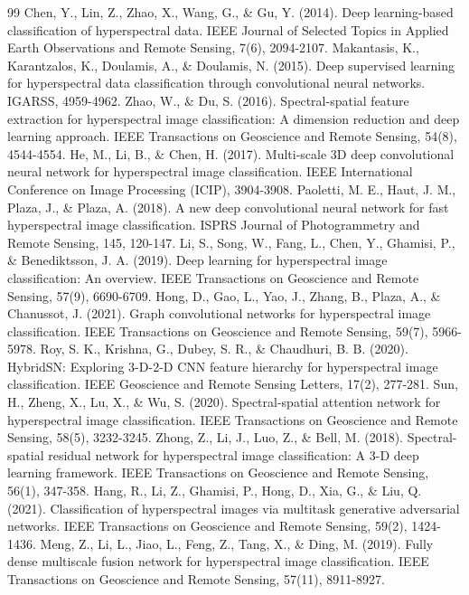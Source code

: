 \documentclass[pdflatex,sn-mathphys-num,iicol]{sn-jnl}
\begin{document}
\begin{thebibliography}{99}
 Chen, Y., Lin, Z., Zhao, X., Wang, G., \& Gu, Y. (2014). Deep learning-based classification of hyperspectral data. IEEE Journal of Selected Topics in Applied Earth Observations and Remote Sensing, 7(6), 2094-2107.
 Makantasis, K., Karantzalos, K., Doulamis, A., \& Doulamis, N. (2015). Deep supervised learning for hyperspectral data classification through convolutional neural networks. IGARSS, 4959-4962.
 Zhao, W., \& Du, S. (2016). Spectral-spatial feature extraction for hyperspectral image classification: A dimension reduction and deep learning approach. IEEE Transactions on Geoscience and Remote Sensing, 54(8), 4544-4554.
 He, M., Li, B., \& Chen, H. (2017). Multi-scale 3D deep convolutional neural network for hyperspectral image classification. IEEE International Conference on Image Processing (ICIP), 3904-3908.
 Paoletti, M. E., Haut, J. M., Plaza, J., \& Plaza, A. (2018). A new deep convolutional neural network for fast hyperspectral image classification. ISPRS Journal of Photogrammetry and Remote Sensing, 145, 120-147.
 Li, S., Song, W., Fang, L., Chen, Y., Ghamisi, P., \& Benediktsson, J. A. (2019). Deep learning for hyperspectral image classification: An overview. IEEE Transactions on Geoscience and Remote Sensing, 57(9), 6690-6709.
 Hong, D., Gao, L., Yao, J., Zhang, B., Plaza, A., \& Chanussot, J. (2021). Graph convolutional networks for hyperspectral image classification. IEEE Transactions on Geoscience and Remote Sensing, 59(7), 5966-5978.
 Roy, S. K., Krishna, G., Dubey, S. R., \& Chaudhuri, B. B. (2020). HybridSN: Exploring 3-D-2-D CNN feature hierarchy for hyperspectral image classification. IEEE Geoscience and Remote Sensing Letters, 17(2), 277-281.
 Sun, H., Zheng, X., Lu, X., \& Wu, S. (2020). Spectral-spatial attention network for hyperspectral image classification. IEEE Transactions on Geoscience and Remote Sensing, 58(5), 3232-3245.
 Zhong, Z., Li, J., Luo, Z., \& Bell, M. (2018). Spectral-spatial residual network for hyperspectral image classification: A 3-D deep learning framework. IEEE Transactions on Geoscience and Remote Sensing, 56(1), 347-358.
 Hang, R., Li, Z., Ghamisi, P., Hong, D., Xia, G., \& Liu, Q. (2021). Classification of hyperspectral images via multitask generative adversarial networks. IEEE Transactions on Geoscience and Remote Sensing, 59(2), 1424-1436.
 Meng, Z., Li, L., Jiao, L., Feng, Z., Tang, X., \& Ding, M. (2019). Fully dense multiscale fusion network for hyperspectral image classification. IEEE Transactions on Geoscience and Remote Sensing, 57(11), 8911-8927.

\end{thebibliography}
\end{document}
